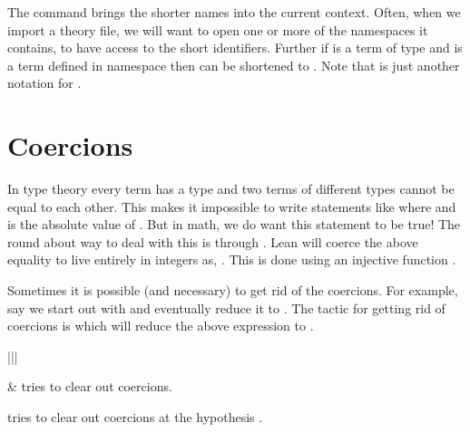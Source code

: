 \documentclass[letterpaper,10pt,english]{sphinxmanual}
\begin{document}
\sphinxAtStartPar
The  command brings the shorter names into the current context. Often, when we import a theory file, we will want to open one or more of the namespaces it contains, to have access to the short identifiers.
Further if  is a term of type  and  is a term defined in namespace  then  can be shortened to .
Note that  is just another notation for .


\section{Coercions}
\label{\detokenize{day5:coercions}}
\sphinxAtStartPar
In type theory every term has a type and two terms of different types cannot be equal to each other.
This makes it impossible to write statements like  where  and  is the absolute value of .
But in math, we do want this statement to be true!
The round about way to deal with this is through .
Lean will coerce the above equality to live entirely in integers as, .
This is done using an injective function .

\sphinxAtStartPar
Sometimes it is possible (and necessary) to get rid of the coercions.
For example, say we start out with  and eventually reduce it to .
The tactic for getting rid of coercions is  which will reduce the above expression to .


\begin{savenotes}\sphinxattablestart
\centering
\begin{tabular}[t]{|||}
\hline

\sphinxAtStartPar
{}
&
\sphinxAtStartPar
{} tries to clear out coercions.

\sphinxAtStartPar
{} tries to clear out coercions at the hypothesis .
\\
\hline
\end{tabular}
\par
\sphinxattableend\end{savenotes}
\end{document}
